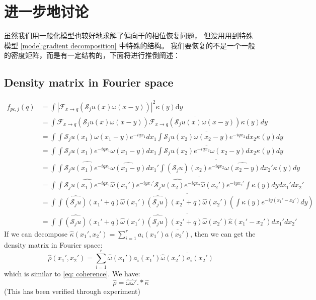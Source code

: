 \documentclass{article}
\numberwithin{equation}{section}
\begin{document}
  
\section{进一步地讨论}
虽然我们用一般化模型也较好地求解了偏向干的相位恢复问题， 但没用用到特殊模型 \ref{model:gradient decomposition} 中特殊的结构。 我们要恢复的不是一个一般的密度矩阵，而是有一定结构的，下面将进行推倒阐述：
  
 \subsection{Density matrix in Fourier space}
  \begin{equation}
  \begin{aligned}
  f_{p c, j}(q) &= \int\left|\mathcal{F}_{x \rightarrow q}\left(\mathcal{S}_{j} u(x) \omega(x-y)\right)\right|^{2} \kappa(y) \mathrm{d} y\\
  &= \int \mathcal{F}_{x \rightarrow q}\left(\mathcal{S}_{j} u(x) \omega(x-y)\right) \overline{ \mathcal{F}_{x \rightarrow q}\left(\mathcal{S}_{j} u(x) \omega(x-y)\right) }  \kappa(y)     dy\\
   &= \int \int \mathcal{S}_{j} u(x_1) \omega(x_1-y) e^{-iqx_1} dx_1 \overline{ \int \mathcal{S}_{j} u(x_2) \omega(x_2-y) e^{-iqx_2}dx_2 }  \kappa(y)   dy \\
   &= \int \int \mathcal{S}_{j} u(x_1)e^{-iqx_1} \omega(x_1-y)  dx_1 \overline{ \int \mathcal{S}_{j} u(x_2)e^{-iqx_2} \omega(x_2-y) dx_2 }  \kappa(y)   dy\\
   &= \int \int \widehat{\mathcal{S}_{j} u(x_1)e^{-iqx_1}} \widehat{\omega(x_1-y)}  dx_1' \overline{ \int \widehat{(\mathcal{S}_{j}u)(x_2) e^{-iqx_2} }  \widehat{\omega(x_2-y)} dx_2' } \kappa(y)   dy\\
  & = \int\int  
   \widehat{\mathcal{S}_{j} u(x_1)e^{-iqx_1}} \widehat{\omega}(x_1')e^{-iyx_1'}  \overline{ \widehat{\mathcal{S}_{j} u(x_2)e^{-iqx_2}} \widehat{\omega}(x_2')e^{-iyx_2'} }   \int   \kappa(y)   dy
  dx_1' dx_2' \\
  & =  \int\int  
  \widehat{(\mathcal{S}_{j}u)}(x_1' + q) \widehat{\omega}(x_1')   \overline{ \widehat{(\mathcal{S}_{j}u)}(x_2' + q) \widehat{\omega}(x_2') }   (\int   \kappa(y)e^{-iy(x_1'-x_2')}  dy ) \\
  & = \int\int  
  \widehat{(\mathcal{S}_{j}u)}(x_1' + q) \widehat{\omega}(x_1')   \overline{ \widehat{(\mathcal{S}_{j}u)}(x_2' + q) \widehat{\omega}(x_2') }    \hat{\kappa}(x_1'-x_2')  
dx_1' dx_2'
  \end{aligned}
  \end{equation}
  If we can decompose $\hat{\kappa}(x_1',x_2') = \sum_{i=1}^r a_i(x_1') \overline{a(x_2')}$, then we can get the density matrix in Fourier space:
  $$
  \hat{\rho}(x_1',x_2') = \sum_{i=1}^{r} \hat{\omega}(x_1')a_i(x_1') \overline{\hat{\omega}(x_2')a_i(x_2')}
  $$
  which is similar to \ref{eq: coherence}. We have:
  $$
   \hat{\rho}  = \hat{\omega}\hat{\omega}' .* \hat{\kappa}
  $$
  (This has been verified through experiment)
  
\end{document}
